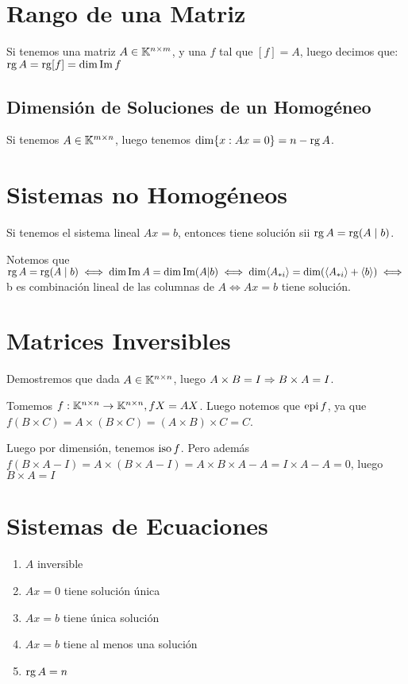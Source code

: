 \documentclass{article}
\begin{document}
\section*{Rango de una Matriz}
Si tenemos una matriz $A \in \mathbb{K}^{n \times m}$, y una $f$ tal que $[f] = A$,
luego decimos que: $\operatorname{rg} A = \operatorname{rg} [f] = \dim \operatorname{Im} f$

\subsection*{Dimensión de Soluciones de un Homogéneo}
Si tenemos $A \in \mathbb{K}^{m \times n}$, luego tenemos $\dim \{x : Ax = 0\} = n -
\operatorname{rg} A$.

\section*{Sistemas no Homogéneos}
Si tenemos el sistema lineal $Ax = b$, entonces tiene solución sii $\operatorname{rg} A = \operatorname{rg}
(A \mid b)$.

Notemos que $\operatorname{rg} A = \operatorname{rg} (A \mid b) \iff \dim \operatorname{Im} A = \dim \operatorname{Im}
(A | b) \iff \dim \langle A_{*i} \rangle = \dim (\langle A_{*i}
\rangle + \langle b \rangle) \iff$ b es combinación lineal de las columnas de
$A \iff Ax = b$ tiene solución.

\section*{Matrices Inversibles}
Demostremos que dada $A \in \mathbb{K}^{n \times n}$, luego $A \times B = I \Rightarrow B
\times A = I$.

Tomemos $f : \mathbb{K}^{n \times n} \to \mathbb{K}^{n \times n}, fX = AX$. Luego notemos que
$\operatorname{epi} f$, ya que $f(B \times C) = A \times (B \times C) = (A \times B) \times C
= C$.

Luego por dimensión, tenemos $\operatorname{iso} f$. Pero además $f(B \times A - I) = A \times (B
\times A - I) = A \times B \times A - A = I \times A - A = 0$, luego $B \times
A = I$

\section*{Sistemas de Ecuaciones}
\begin{enumerate}
	\item $A$ inversible
	\item $Ax = 0$ tiene solución única
	\item $Ax = b$ tiene única solución
	\item $Ax = b$ tiene al menos una solución
	\item $\operatorname{rg} A = n$
\end{enumerate}
\end{document}
